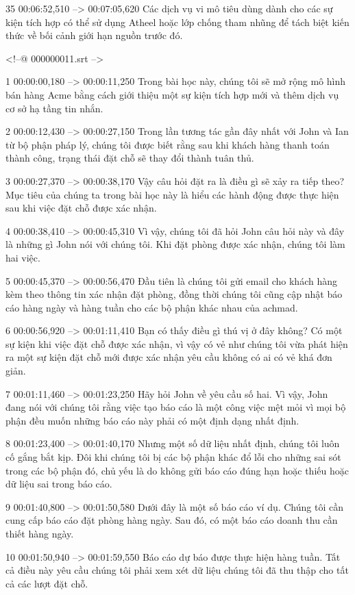 35
00:06:52,510 --> 00:07:05,620
Các dịch vụ vi mô tiêu dùng dành cho các sự kiện tích hợp có thể sử dụng Atheel hoặc lớp chống tham nhũng để tách biệt kiến ​​thức về bối cảnh giới hạn nguồn trước đó.

<!--@ 000000011.srt -->

1
00:00:00,180 --> 00:00:11,250
Trong bài học này, chúng tôi sẽ mở rộng mô hình bán hàng Acme bằng cách giới thiệu một sự kiện tích hợp mới và thêm dịch vụ cơ sở hạ tầng tin nhắn.

2
00:00:12,430 --> 00:00:27,150
Trong lần tương tác gần đây nhất với John và Ian từ bộ phận pháp lý, chúng tôi được biết rằng sau khi khách hàng thanh toán thành công, trạng thái đặt chỗ sẽ thay đổi thành tuân thủ.

3
00:00:27,370 --> 00:00:38,170
Vậy câu hỏi đặt ra là điều gì sẽ xảy ra tiếp theo?  Mục tiêu của chúng ta trong bài học này là hiểu các hành động được thực hiện sau khi việc đặt chỗ được xác nhận.

4
00:00:38,410 --> 00:00:45,310
Vì vậy, chúng tôi đã hỏi John câu hỏi này và đây là những gì John nói với chúng tôi.  Khi đặt phòng được xác nhận, chúng tôi làm hai việc.

5
00:00:45,370 --> 00:00:56,470
Đầu tiên là chúng tôi gửi email cho khách hàng kèm theo thông tin xác nhận đặt phòng, đồng thời chúng tôi cũng cập nhật báo cáo hàng ngày và hàng tuần cho các bộ phận khác nhau của achmad.

6
00:00:56,920 --> 00:01:11,410
Bạn có thấy điều gì thú vị ở đây không?  Có một sự kiện khi việc đặt chỗ được xác nhận, vì vậy có vẻ như chúng tôi vừa phát hiện ra một sự kiện đặt chỗ mới được xác nhận yêu cầu không có ai có vẻ khá đơn giản.

7
00:01:11,460 --> 00:01:23,250
Hãy hỏi John về yêu cầu số hai.  Vì vậy, John đang nói với chúng tôi rằng việc tạo báo cáo là một công việc mệt mỏi vì mọi bộ phận đều muốn những báo cáo này phải có một định dạng nhất định.

8
00:01:23,400 --> 00:01:40,170
Nhưng một số dữ liệu nhất định, chúng tôi luôn cố gắng bắt kịp.  Đôi khi chúng tôi bị các bộ phận khác đổ lỗi cho những sai sót trong các bộ phận đó, chủ yếu là do không gửi báo cáo đúng hạn hoặc thiếu hoặc dữ liệu sai trong báo cáo.

9
00:01:40,800 --> 00:01:50,580
Dưới đây là một số báo cáo ví dụ.  Chúng tôi cần cung cấp báo cáo đặt phòng hàng ngày.  Sau đó, có một báo cáo doanh thu cần thiết hàng ngày.

10
00:01:50,940 --> 00:01:59,550
Báo cáo dự báo được thực hiện hàng tuần.  Tất cả điều này yêu cầu chúng tôi phải xem xét dữ liệu chúng tôi đã thu thập cho tất cả các lượt đặt chỗ.

